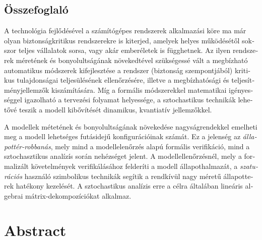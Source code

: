 \begin{otherlanguage}{magyar}

  \chapter{Összefoglaló}

  A technológia fejlődésével a számítógépes rendszerek alkalmazási
  köre ma már olyan biztonságkritikus rendszerekre is kiterjed,
  amelyek helyes működésétől sokszor teljes vállalatok sorsa, vagy
  akár emberéletek is függhetnek. Az ilyen rendszerek méretének és
  bonyolultságának növekedtével szükségessé vált a megbízható
  automatikus módszerek kifejlesztése a rendszer (biztonság
  szempontjából) kritikus tulajdonságai teljesülésének ellenőrzésére,
  illetve a megbízhatósági és teljesítményjellemzők kiszámítására. Míg
  a formális módszerekkel matematikai igényességgel igazolható a
  tervezési folyamat helyessége, a sztochastikus technikák lehetővé
  teszik a modell kibővítését dinamikus, kvantiatív jellemzőkkel.

  A modellek métetének és bonyolultságának növekedése nagyságrendekkel
  emelheti meg a modell lehetséges futásidejű konfigurációinak
  számát. Ez a jelenség az \emph{állapottér-robbanás}, mely mind a
  modellelenőrzés alapú formális verifikáció, mind a sztochasztikus
  analízís során nehézséget jelent. A modellellenőrzésnél, mely a
  formalizált követelmények verifikálásához felderíti a modell
  állapothalmazát, a \emph{szaturációs} használó szimbolikus technikák
  segítik a rendkívül nagy méretű állapotterek hatékony kezelését. A
  sztochastikus analízis erre a célra általában lineáris algebrai
  mátrix-dekompozíciókat alkalmaz.

\end{otherlanguage}

\chapter{Abstract}

